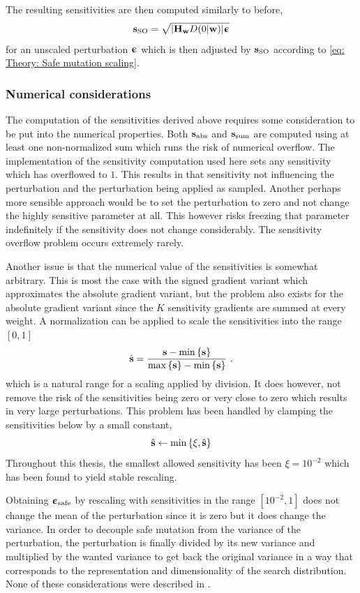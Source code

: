 The resulting sensitivities are then computed similarly to before,
\begin{equation}
    {\mathbf{s}}_\text{SO} = \sqrt{{\left\lvert{\mathbf{H}}_{\mathbf{w}} D(0|{\mathbf{w}})\right\rvert}{\boldsymbol{\upepsilon}}}
\end{equation}
for an unscaled perturbation ${\boldsymbol{\upepsilon}}$ which is then adjusted by ${\mathbf{s}}_\text{SO}$ according to \eqref{eq: Theory: Safe mutation scaling}.


\subsubsection{Numerical considerations}
The computation of the sensitivities derived above requires some consideration to be put into the numerical properties. Both ${\mathbf{s}}_\text{abs}$ and ${\mathbf{s}}_\text{sum}$ are computed using at least one non-normalized sum which runs the risk of numerical overflow. The implementation of the sensitivity computation used here sets any sensitivity which has overflowed to $1$. This results in that sensitivity not influencing the perturbation and the perturbation being applied as sampled. Another perhaps more sensible approach would be to set the perturbation to zero and not change the highly sensitive parameter at all. This however risks freezing that parameter indefinitely if the sensitivity does not change considerably. The sensitivity overflow problem occurs extremely rarely.

Another issue is that the numerical value of the sensitivities is somewhat arbitrary. This is most the case with the signed gradient variant which approximates the absolute gradient variant, but the problem also exists for the absolute gradient variant since the $K$ sensitivity gradients are summed at every weight. A normalization can be applied to scale the sensitivities into the range $[0,1]$
\begin{equation}
    \hat{{\mathbf{s}}} = \frac{{\mathbf{s}}-\min{\left\{{\mathbf{s}}\right\}}}{\max{\left\{{\mathbf{s}}\right\}} - \min{\left\{{\mathbf{s}}\right\}}} \ .
\end{equation}
which is a natural range for a scaling applied by division.
It does however, not remove the risk of the sensitivities being zero or very close to zero which results in very large perturbations. This problem has been handled by clamping the sensitivities below by a small constant,
\begin{equation}
    \hat{{\mathbf{s}}} \leftarrow \min{\left\{\xi,\hat{{\mathbf{s}}}\right\}}
\end{equation}
Throughout this thesis, the smallest allowed sensitivity has been $\xi=10^{-2}$ which has been found to yield stable rescaling. 

Obtaining ${\boldsymbol{\upepsilon}}_\text{safe}$ by rescaling with sensitivities in the range $[10^{-2},1]$ does not change the mean of the perturbation since it is zero but it does change the variance. In order to decouple safe mutation from the variance of the perturbation, the perturbation is finally divided by its new variance and multiplied by the wanted variance to get back the original variance in a way that corresponds to the representation and dimensionality of the search distribution. None of these considerations were described in \cite{Lehman2017a}.
